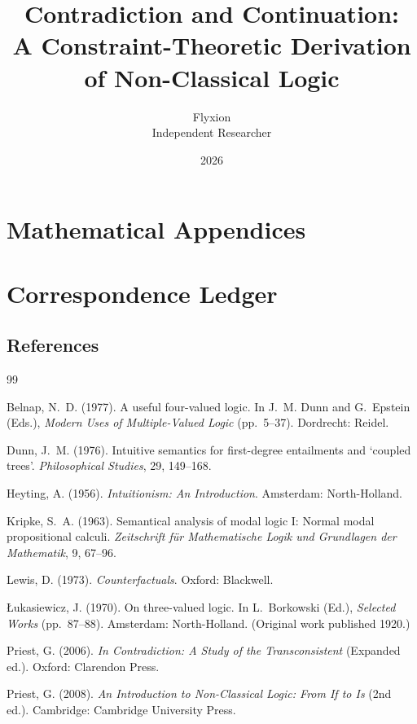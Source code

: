\documentclass[11pt,twoside]{book}
\title{\bfseries Contradiction and Continuation:\\[0.3em]
\large A Constraint-Theoretic Derivation of Non-Classical Logic}
\author{Flyxion \\ \normalsize Independent Researcher}
\date{2026}
\begin{document}
\frontmatter

\maketitle

\tableofcontents



\mainmatter









\appendix
\part{Mathematical Appendices}


\part{Correspondence Ledger}


\backmatter
\chapter*{References}
\begin{thebibliography}{99}

Belnap, N.~D. (1977). A useful four-valued logic. In J.~M. Dunn and G.~Epstein (Eds.), \emph{Modern Uses of Multiple-Valued Logic} (pp.~5--37). Dordrecht: Reidel.

Dunn, J.~M. (1976). Intuitive semantics for first-degree entailments and `coupled trees'. \emph{Philosophical Studies}, 29, 149--168.

Heyting, A. (1956). \emph{Intuitionism: An Introduction}. Amsterdam: North-Holland.

Kripke, S.~A. (1963). Semantical analysis of modal logic I: Normal modal propositional calculi. \emph{Zeitschrift f\"ur Mathematische Logik und Grundlagen der Mathematik}, 9, 67--96.

Lewis, D. (1973). \emph{Counterfactuals}. Oxford: Blackwell.

{\L}ukasiewicz, J. (1970). On three-valued logic. In L.~Borkowski (Ed.), \emph{Selected Works} (pp.~87--88). Amsterdam: North-Holland. (Original work published 1920.)

Priest, G. (2006). \emph{In Contradiction: A Study of the Transconsistent} (Expanded ed.). Oxford: Clarendon Press.

Priest, G. (2008). \emph{An Introduction to Non-Classical Logic: From If to Is} (2nd ed.). Cambridge: Cambridge University Press.

\end{thebibliography}
\end{document}
